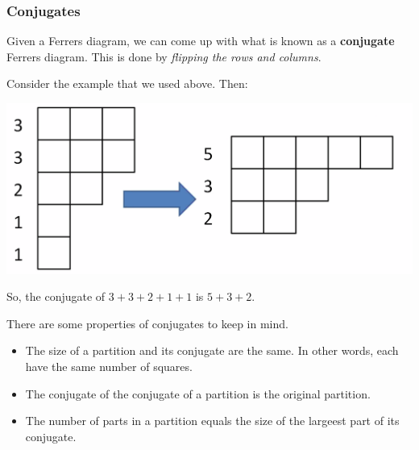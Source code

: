 \documentclass[letterpaper]{article}
\begin{document}
\subsubsection{Conjugates}
Given a Ferrers diagram, we can come up with what is known as a \textbf{conjugate} Ferrers diagram. This is done by \emph{flipping the rows and columns}.

\bigskip 

Consider the example that we used above. Then:
\begin{center}
    \includegraphics[scale=0.3]{conj.PNG}
\end{center}
So, the conjugate of $3 + 3 + 2 + 1 + 1$ is $5 + 3 + 2$. 

\bigskip 

There are some properties of conjugates to keep in mind.
\begin{itemize}
    \item The size of a partition and its conjugate are the same. In other words, each have the same number of squares.
    \item The conjugate of the conjugate of a partition is the original partition.
    \item The number of parts in a partition equals the size of the largeest part of its conjugate.
\end{itemize}
\end{document}
